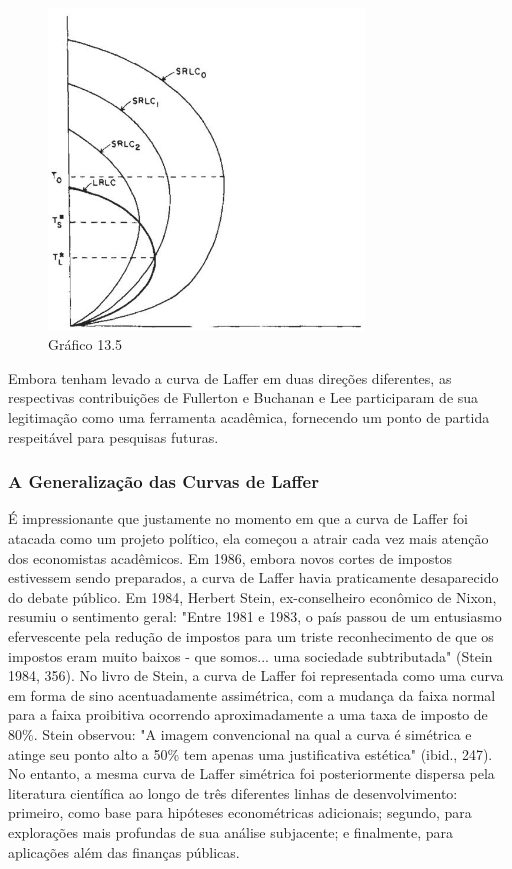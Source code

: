 \documentclass[a4paper,12pt]{article}[abntex2]
\begin{document}
    \begin{figure}[H]
    \centering
    \caption{Gráfico 13.5}
    \includegraphics[width=0.75\textwidth]{4º Período/História do Pensamento Econômico/Tradução HPE/Tradução Tópico 9.3/figura 5.png}
    \end{figure}

Embora tenham levado a curva de Laffer em duas direções diferentes, as respectivas contribuições de Fullerton e Buchanan e Lee participaram de sua legitimação como uma ferramenta acadêmica, fornecendo um ponto de partida respeitável para pesquisas futuras.

\subsubsection{\textbf{A Generalização das Curvas de Laffer}}

É impressionante que justamente no momento em que a curva de Laffer foi atacada como um projeto político, ela começou a atrair cada vez mais atenção dos economistas acadêmicos. Em 1986, embora novos cortes de impostos estivessem sendo preparados, a curva de Laffer havia praticamente desaparecido do debate público. Em 1984, Herbert Stein, ex-conselheiro econômico de Nixon, resumiu o sentimento geral: "Entre 1981 e 1983, o país passou de um entusiasmo efervescente pela redução de impostos para um triste reconhecimento de que os impostos eram muito baixos - que somos... uma sociedade subtributada" (Stein 1984, 356). No livro de Stein, a curva de Laffer foi representada como uma curva em forma de sino acentuadamente assimétrica, com a mudança da faixa normal para a faixa proibitiva ocorrendo aproximadamente a uma taxa de imposto de 80\%. Stein observou: "A imagem convencional na qual a curva é simétrica e atinge seu ponto alto a 50\% tem apenas uma justificativa estética" (ibid., 247). No entanto, a mesma curva de Laffer simétrica foi posteriormente dispersa pela literatura científica ao longo de três diferentes linhas de desenvolvimento: primeiro, como base para hipóteses econométricas adicionais; segundo, para explorações mais profundas de sua análise subjacente; e finalmente, para aplicações além das finanças públicas.
\end{document}
